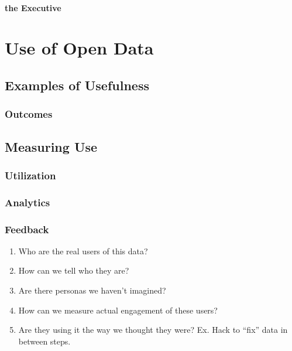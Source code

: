 \documentclass[
]{book}
\providecommand{\tightlist}{%
  \setlength{\itemsep}{0pt}\setlength{\parskip}{0pt}}
\begin{document}
\hypertarget{the-executive}{%
\subsubsection{the Executive}\label{the-executive}}

\hypertarget{use}{%
\chapter{Use of Open Data}\label{use}}

\hypertarget{examples-of-usefulness}{%
\section{Examples of Usefulness}\label{examples-of-usefulness}}

\hypertarget{outcomes}{%
\subsection{Outcomes}\label{outcomes}}

\hypertarget{measuring-use}{%
\section{Measuring Use}\label{measuring-use}}

\hypertarget{utilization}{%
\subsection{Utilization}\label{utilization}}

\hypertarget{analytics}{%
\subsection{Analytics}\label{analytics}}

\hypertarget{feedback}{%
\subsection{Feedback}\label{feedback}}

\begin{enumerate}
\def\labelenumi{\arabic{enumi}.}
\tightlist
\item
  Who are the real users of this data?
\item
  How can we tell who they are?
\item
  Are there personas we haven't imagined?
\item
  How can we measure actual engagement of these users?
\item
  Are they using it the way we thought they were? Ex. Hack to ``fix'' data in between steps.
\end{enumerate}
\end{document}
